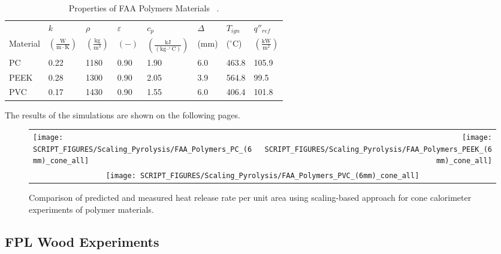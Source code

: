 \begin{table}[!h]
\caption[Properties of FAA Polymers Materials]{Properties of FAA Polymers Materials ~\cite{Stoliarov:CF2009,Stoliarov:FM2012}.}
\centering
\begin{tabular}{|p{5.5cm}|p{1.0cm}|p{1.0cm}|p{0.8cm}|p{1.4cm}|p{1.0cm}|p{1.0cm}|p{1.2cm}|}
\hline
                                               & $k$    & $\rho$      & $\varepsilon$   & $c_{p}$ & $\Delta$    & $T_{ign}$ & $q''_{ref}$ \\
Material                                       & $\mathrm{\left(\frac{W}{m\cdot K}\right)}$ & $\mathrm{\left(\frac{kg}{m^{3}}\right)}$ & $\mathrm{( - )}$ & $\mathrm{\left(\frac{kJ}{(kg\cdot ^{\circ}C)}\right)}$ &  ($\mathrm{mm}$)   & ($\mathrm{^{\circ}C}$) & $\mathrm{\left(\frac{kW}{m^{2}}\right)}$ \\ \hline
\hline
PC  & 0.22 & 1180 & 0.90 & 1.90 & 6.0 & 463.8 & 105.9 \\ \hline 
PEEK  & 0.28 & 1300 & 0.90 & 2.05 & 3.9 & 564.8 & 99.5 \\ \hline 
PVC  & 0.17 & 1430 & 0.90 & 1.55 & 6.0 & 406.4 & 101.8 \\ \hline 
\end{tabular}
\label{Properties_FAA_Polymers_Materials_polymers}
\end{table}

The results of the simulations are shown on the following pages.

\begin{figure}[!htbp]
\begin{tabular*}{\textwidth}{l@{\extracolsep{\fill}}r}
\texttt{[image: SCRIPT\_FIGURES/Scaling\_Pyrolysis/FAA\_Polymers\_PC\_(6mm)\_cone\_all]} &
\texttt{[image: SCRIPT\_FIGURES/Scaling\_Pyrolysis/FAA\_Polymers\_PEEK\_(6mm)\_cone\_all]} \\
\multicolumn{2}{c}{\texttt{[image: SCRIPT\_FIGURES/Scaling\_Pyrolysis/FAA\_Polymers\_PVC\_(6mm)\_cone\_all]}}
\end{tabular*}
\caption[Heat release rate per unit area of FAA Polymers materials using scaling model]
{Comparison of predicted and measured heat release rate per unit area using scaling-based approach for cone calorimeter experiments of polymer materials.}
\label{FAA_Polymers_HRR_polymers}
\end{figure}

\clearpage

\subsection{FPL Wood Experiments}\label{sec_FPL_Woods_Materials}

